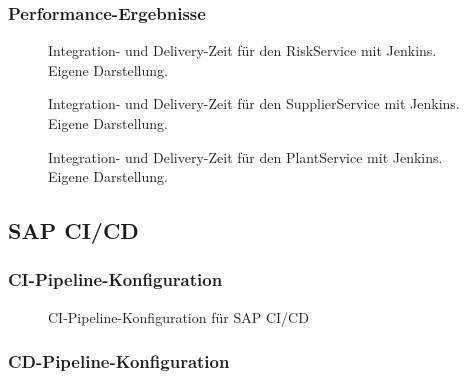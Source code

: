 \subsubsection{Performance-Ergebnisse}

\begin{center}
	\begin{figure}[H]
		\centering
		\caption[]{Integration- und Delivery-Zeit für den RiskService mit Jenkins. Eigene Darstellung.}
		\label{fig:JP_Risk}
	\end{figure}
\end{center}

\begin{center}
	\begin{figure}[H]
		\centering
		\caption[]{Integration- und Delivery-Zeit für den SupplierService mit Jenkins. Eigene Darstellung.}
		\label{fig:JP_Supplier}
	\end{figure}
\end{center}
\begin{center}
	\begin{figure}[H]
		\centering
		\caption[]{Integration- und Delivery-Zeit für den PlantService mit Jenkins. Eigene Darstellung.}
		\label{fig:JP_Plant}
	\end{figure}
\end{center}

\subsection{SAP CI/CD}
\subsubsection{CI-Pipeline-Konfiguration}

\begin{center}
	\begin{figure}[H]
		\centering
		\caption[]{CI-Pipeline-Konfiguration für SAP CI/CD }
		\label{fig:S_IMPl}
	\end{figure}
\end{center}

\subsubsection{CD-Pipeline-Konfiguration}

